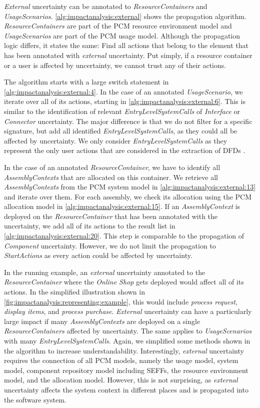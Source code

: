 \emph{External} uncertainty can be annotated to \emph{ResourceContainers} and \emph{UsageScenarios}.
\autoref{alg:impactanalysis:external} shows the propagation algorithm.
\emph{ResourceContainers} are part of the \ac{PCM} resource environment model and \emph{UsageScenarios} are part of the \ac{PCM} usage model.
Although the propagation logic differs, it states the same: Find all actions that belong to the element that has been annotated with \emph{external} uncertainty.
Put simply, if a resource container or a user is affected by uncertainty, we cannot trust any of their actions.

The algorithm starts with a large switch statement in \autoref{alg:impactanalysis:external:4}.
In the case of an annotated \emph{UsageScenario}, we iterate over all of its actions, starting in \autoref{alg:impactanalysis:external:6}.
This is similar to the identification of relevant \emph{EntryLevelSystemCalls} of \emph{Interface} or \emph{Connector} uncertainty.
The major difference is that we do not filter for a specific signature, but add all identified \emph{EntryLevelSystemCalls}, as they could all be affected by uncertainty.
We only consider \emph{EntryLevelSystemCalls} as they represent the only user actions that are considered in the extraction of \acp{DFD} \cite{seifermann_architectural_2022}.

In the case of an annotated \emph{ResourceContainer}, we have to identify all \emph{AssemblyContexts} that are allocated on this container.
We retrieve all \emph{AssemblyContexts} from the \ac{PCM} system model in \autoref{alg:impactanalysis:external:13} and iterate over them.
For each assembly, we check its allocation using the \ac{PCM} allocation model in \autoref{alg:impactanalysis:external:15}.
If an \emph{AssemblyContext} is deployed on the \emph{ResourceContainer} that has been annotated with the uncertainty, we add all of its actions to the result list in \autoref{alg:impactanalysis:external:20}.
This step is comparable to the propagation of \emph{Component} uncertainty.
However, we do not limit the propagation to \emph{StartActions} as every action could be affected by uncertainty.

In the running example, an \emph{external} uncertainty annotated to the \emph{ResourceContainer} where the \emph{Online Shop} gets deployed would affect all of its actions.
In the simplified illustration shown in \autoref{fig:impactanalysis:representing:example}, this would include \emph{process request}, \emph{display items}, and \emph{process purchase}.
\emph{External} uncertainty can have a particularly large impact if many \emph{AssemblyContexts} are deployed on a single \emph{ResourceContainers} affected by uncertainty.
The same applies to \emph{UsageScenarios} with many \emph{EntryLevelSystemCalls}.
Again, we simplified some methods shown in the algorithm to increase understandability.
Interestingly, \emph{external} uncertainty requires the connection of all \ac{PCM} models, namely the usage model, system model, component repository model including \acp{SEFF}, the resource environment model, and the allocation model.
However, this is not surprising, as \emph{external} uncertainty affects the system context in different places and is propagated into the software system.


